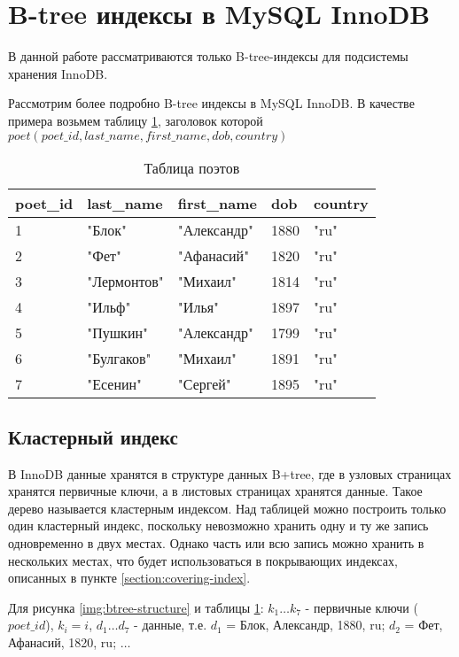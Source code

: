 \section{B-tree индексы в MySQL InnoDB}
\label{section:b-tree-indexes-innodb}

В данной работе рассматриваются только B-tree-индексы для подсистемы хранения InnoDB.

Рассмотрим более подробно B-tree индексы в MySQL InnoDB. В качестве примера возьмем таблицу \ref{tabular:poets}, заголовок которой $poet (poet\_id, last\_name, first\_name, dob, country)$

\begin{table}[h]
\caption{Таблица поэтов}
\label{tabular:poets}
\medskip
\begin{tabular}{|l|l|l|l|l|}
\hline
poet\_id & last\_name & first\_name & dob & country\\
\hline
1 & "Блок" & "Александр" & 1880 & "ru"\\
2 & "Фет" & "Афанасий" & 1820 & "ru"\\
3 & "Лермонтов" & "Михаил" & 1814 & "ru"\\
4 & "Ильф" & "Илья" & 1897 & "ru"\\
5 & "Пушкин" & "Александр" & 1799 & "ru"\\
6 & "Булгаков" & "Михаил" & 1891 & "ru"\\
7 & "Есенин" & "Сергей" & 1895 & "ru"\\
\hline
\end{tabular}
\end{table}

\subsection{Кластерный индекс}

В InnoDB данные хранятся в структуре данных B+tree, где в узловых страницах хранятся первичные ключи, а в листовых страницах хранятся данные. Такое дерево называется кластерным индексом. Над таблицей можно построить только один кластерный индекс, поскольку невозможно хранить одну и ту же запись одновременно в двух местах. Однако часть или всю запись можно хранить в нескольких местах, что будет использоваться в покрывающих индексах, описанных в пункте \ref{section:covering-index}.

Для рисунка \ref{img:btree-structure} и таблицы \ref{tabular:poets}: $k_1 \ldots k_7$ - первичные ключи ($poet\_id$), $k_i = i$, $d_1 \ldots d_7$ - данные, т.е. $d_1$ = Блок, Александр, 1880, ru; $d_2$ = Фет, Афанасий, 1820, ru; $\ldots$


